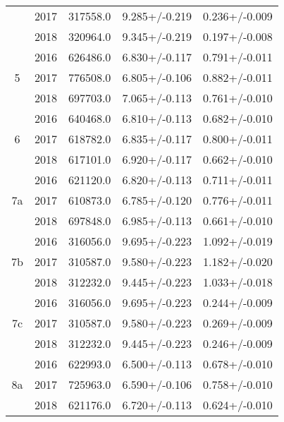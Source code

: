 \begin{table}
\begin{tabular}{ccccc}
   & 2017 &         317558.0 &            9.285+/-0.219 &          0.236+/-0.009 \\
   & 2018 &         320964.0 &            9.345+/-0.219 &          0.197+/-0.008 \\
\cline{1-5}
\multirow{3}{*}{5} & 2016 &         626486.0 &            6.830+/-0.117 &          0.791+/-0.011 \\
   & 2017 &         776508.0 &            6.805+/-0.106 &          0.882+/-0.011 \\
   & 2018 &         697703.0 &            7.065+/-0.113 &          0.761+/-0.010 \\
\cline{1-5}
\multirow{3}{*}{6} & 2016 &         640468.0 &            6.810+/-0.113 &          0.682+/-0.010 \\
   & 2017 &         618782.0 &            6.835+/-0.117 &          0.800+/-0.011 \\
   & 2018 &         617101.0 &            6.920+/-0.117 &          0.662+/-0.010 \\
\cline{1-5}
\multirow{3}{*}{7a} & 2016 &         621120.0 &            6.820+/-0.113 &          0.711+/-0.011 \\
   & 2017 &         610873.0 &            6.785+/-0.120 &          0.776+/-0.011 \\
   & 2018 &         697848.0 &            6.985+/-0.113 &          0.661+/-0.010 \\
\cline{1-5}
\multirow{3}{*}{7b} & 2016 &         316056.0 &            9.695+/-0.223 &          1.092+/-0.019 \\
   & 2017 &         310587.0 &            9.580+/-0.223 &          1.182+/-0.020 \\
   & 2018 &         312232.0 &            9.445+/-0.223 &          1.033+/-0.018 \\
\cline{1-5}
\multirow{3}{*}{7c} & 2016 &         316056.0 &            9.695+/-0.223 &          0.244+/-0.009 \\
   & 2017 &         310587.0 &            9.580+/-0.223 &          0.269+/-0.009 \\
   & 2018 &         312232.0 &            9.445+/-0.223 &          0.246+/-0.009 \\
\cline{1-5}
\multirow{3}{*}{8a} & 2016 &         622993.0 &            6.500+/-0.113 &          0.678+/-0.010 \\
   & 2017 &         725963.0 &            6.590+/-0.106 &          0.758+/-0.010 \\
   & 2018 &         621176.0 &            6.720+/-0.113 &          0.624+/-0.010 \\
\bottomrule
\end{tabular}
\end{table}
